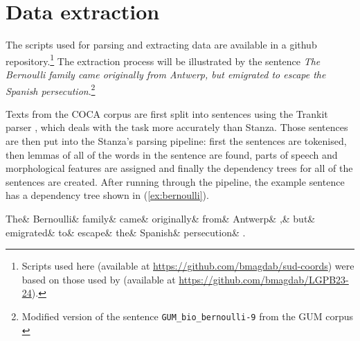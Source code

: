 \newpage

\section{Data extraction}

The scripts used for parsing and extracting data are available in a github repository.\footnote{Scripts used here (available at \url{https://github.com/bmagdab/sud-coords}) were based on those used by \cite{pbg2023} (available at \url{https://github.com/bmagdab/LGPB23-24}).} The extraction process will be illustrated by the sentence \textsl{The Bernoulli family came originally from Antwerp, but emigrated to escape the Spanish persecution}.\footnote{Modified version of the sentence \texttt{GUM\_bio\_bernoulli-9} from the GUM corpus \citep{Zeldes2017}} 

Texts from the COCA corpus are first split into sentences using the Trankit parser \citep{nguyen2021trankit}, which deals with the task more accurately than Stanza. Those sentences are then put into the Stanza's parsing pipeline: first the sentences are tokenised, then lemmas of all of the words in the sentence are found, parts of speech and morphological features are assigned and finally the dependency trees for all of the sentences are created. After running through the pipeline, the example sentence has a dependency tree shown in (\ref{ex:bernoulli}). 

\begin{adjustwidth}{-90pt}{70pt}
\small
\begin{exe}
\ex\label{ex:bernoulli}
\begin{dependency}[baseline=-\the\dimexpr\fontdimen22\textfont2\relax]
	\begin{deptext}
		 The\& Bernoulli\& family\& came\& originally\& from\& Antwerp\& ,\& but\& emigrated\& to\& escape\& the\& Spanish\& persecution\& .\\
	 \end{deptext} 
\end{dependency}
\end{exe}
\end{adjustwidth}

